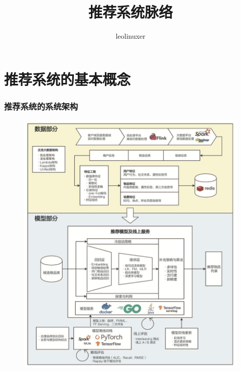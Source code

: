 \documentclass[12pt]{article}
\title{推荐系统脉络\cite{Deep_Learning_Recommender_System}}
\author{leolinuxer}
\begin{document}
\maketitle
\tableofcontents

\part{推荐系统的基本概念}
\section{推荐系统的系统架构}
\begin{figure}[H]
    \centering
    \includegraphics[width=1\textwidth]{fig/Deep_Learning_Refenrence_System_Architecture.jpg}
\end{figure}
\end{document}
